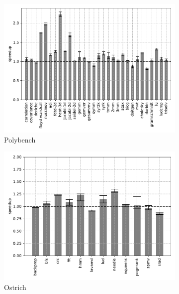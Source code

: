 \begin{figure}
    \centering
    \begin{subfigure}[t]{\textwidth}
        \includegraphics[width=\textwidth]
        {Images/6.1.RQ1/polybench-wasmtime-naive.pdf}
        \caption{Polybench}
    \end{subfigure}
    \begin{subfigure}[t]{.45\textwidth}
        \includegraphics[width=\textwidth]
        {Images/6.1.RQ1/ostrich-wasmtime-naive.pdf}
        \caption{Ostrich}
    \end{subfigure}
    \begin{subfigure}[t]{.45\textwidth}

\end{subfigure}
\end{figure}
